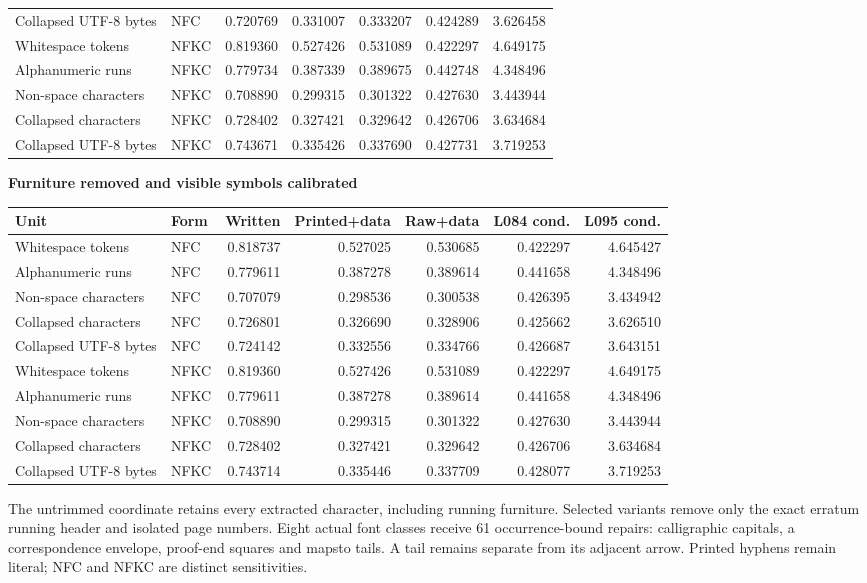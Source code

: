 \documentclass[a4paper,11pt]{article}
\begin{document}
{\begin{tabular}{@{}llrrrrr@{}}
Collapsed UTF-8 bytes & NFC & 0.720769 & 0.331007 & 0.333207 & 0.424289 & 3.626458 \\
Whitespace tokens & NFKC & 0.819360 & 0.527426 & 0.531089 & 0.422297 & 4.649175 \\
Alphanumeric runs & NFKC & 0.779734 & 0.387339 & 0.389675 & 0.442748 & 4.348496 \\
Non-space characters & NFKC & 0.708890 & 0.299315 & 0.301322 & 0.427630 & 3.443944 \\
Collapsed characters & NFKC & 0.728402 & 0.327421 & 0.329642 & 0.426706 & 3.634684 \\
Collapsed UTF-8 bytes & NFKC & 0.743671 & 0.335426 & 0.337690 & 0.427731 & 3.719253 \\\bottomrule\end{tabular}
\par\vspace{6pt}\textbf{Furniture removed and visible symbols calibrated}\par\smallskip\begin{tabular}{@{}llrrrrr@{}}\toprule Unit & Form & Written & Printed+data & Raw+data & L084 cond. & L095 cond.\\\midrule Whitespace tokens & NFC & 0.818737 & 0.527025 & 0.530685 & 0.422297 & 4.645427 \\
Alphanumeric runs & NFC & 0.779611 & 0.387278 & 0.389614 & 0.441658 & 4.348496 \\
Non-space characters & NFC & 0.707079 & 0.298536 & 0.300538 & 0.426395 & 3.434942 \\
Collapsed characters & NFC & 0.726801 & 0.326690 & 0.328906 & 0.425662 & 3.626510 \\
Collapsed UTF-8 bytes & NFC & 0.724142 & 0.332556 & 0.334766 & 0.426687 & 3.643151 \\
Whitespace tokens & NFKC & 0.819360 & 0.527426 & 0.531089 & 0.422297 & 4.649175 \\
Alphanumeric runs & NFKC & 0.779611 & 0.387278 & 0.389614 & 0.441658 & 4.348496 \\
Non-space characters & NFKC & 0.708890 & 0.299315 & 0.301322 & 0.427630 & 3.443944 \\
Collapsed characters & NFKC & 0.728402 & 0.327421 & 0.329642 & 0.426706 & 3.634684 \\
Collapsed UTF-8 bytes & NFKC & 0.743714 & 0.335446 & 0.337709 & 0.428077 & 3.719253 \\\bottomrule\end{tabular}}

The untrimmed coordinate retains every extracted character, including running
furniture. Selected variants remove only the exact erratum running header and
isolated page numbers. Eight actual font classes receive 61 occurrence-bound
repairs: calligraphic capitals, a correspondence envelope, proof-end squares
and mapsto tails. A tail remains separate from its adjacent arrow. Printed
hyphens remain literal; NFC and NFKC are distinct sensitivities.
\end{document}
